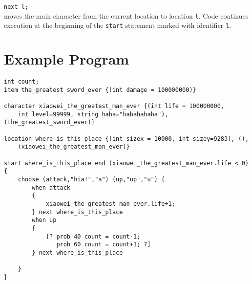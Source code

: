 \documentclass[12pt]{article}
\begin{document}
\texttt{next l;} \\

\noindent moves the main character from the current location to location \texttt{l}.  Code continues execution at the beginning of the \texttt{start} statement marked with identifier \texttt{l}.

\section{Example Program}

\begin{verbatim}
int count;
item the_greatest_sword_ever {(int damage = 100000000)}

character xiaowei_the_greatest_man_ever {(int life = 100000000, 
    int level=99999, string haha="hahahahaha"), (the_greatest_sword_ever)}

location where_is_this_place {(int sizex = 10000, int sizey=9283), (),
    (xiaowei_the_greatest_man_ever)}

start where_is_this_place end (xiaowei_the_greatest_man_ever.life < 0) {
    choose (attack,"hia!","a") (up,"up","u") {
        when attack 
        {
            xiaowei_the_greatest_man_ever.life+1;
        } next where_is_this_place
        when up 
        {
            [? prob 40 count = count-1;
               prob 60 count = count+1; ?]
        } next where_is_this_place
		
    }
}
\end{verbatim}
\end{document}
